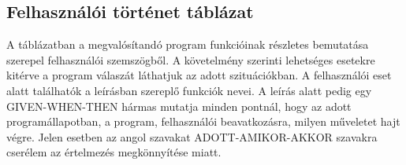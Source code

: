 	\subsection{Felhasználói történet táblázat}
	
	A táblázatban a megvalósítandó program funkcióinak részletes bemutatása szerepel felhasználói szemszögből. A követelmény szerinti lehetséges esetekre kitérve a program válaszát láthatjuk az adott szituációkban. A felhasználói eset alatt találhatók a leírásban szereplő funkciók nevei. A leírás alatt pedig egy GIVEN-WHEN-THEN hármas mutatja minden pontnál, hogy az adott programállapotban, a program, felhasználói beavatkozásra, milyen műveletet hajt végre. Jelen esetben az angol szavakat ADOTT-AMIKOR-AKKOR szavakra cserélem az értelmezés megkönnyítése miatt.
	
	\singlespacing

